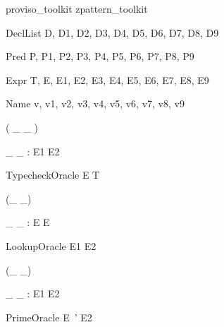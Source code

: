 \documentclass{article}
\begin{document}
\begin{zsection}
  \SECTION proviso\_toolkit \parents zpattern\_toolkit
\end{zsection}

\begin{zedjoker}{DeclList} D, D1, D2, D3, D4, D5, D6, D7, D8, D9 \end{zedjoker}
\begin{zedjoker}{Pred} P, P1, P2, P3, P4, P5, P6, P7, P8, P9 \end{zedjoker}
\begin{zedjoker}{Expr} T, E, E1, E2, E3, E4, E5, E6, E7, E8, E9 \end{zedjoker}
\begin{zedjoker}{Name} v, v1, v2, v3, v4, v5, v6, v7, v8, v9 \end{zedjoker}


\begin{zed}
  \relation ( \_ \hasType \_ )
\end{zed}

\begin{gendef}[E1,E2]
  \_ \hasType \_ : E1 \rel E2
\end{gendef}

\begin{zedproviso}{TypecheckOracle}
  E \hasType T
\end{zedproviso}




\begin{zed}
  \relation (\_ \hasDefn \_)
\end{zed}

\begin{gendef}[E]
  \_ \hasDefn \_ : E \rel E
\end{gendef}

\begin{zedproviso}{LookupOracle}
  E1 \hasDefn E2
\end{zedproviso}




\begin{zed}
  \relation (\_ \is \_)
\end{zed}

\begin{gendef}[E1,E2]
  \_ \is \_ : E1 \rel E2
\end{gendef}

\begin{zedproviso}{PrimeOracle}
  E~' \is E2
\end{zedproviso}
\end{document}
